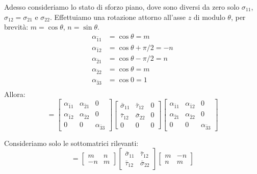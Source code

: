 Adesso consideriamo lo stato di sforzo piano, dove sono diversi da zero solo $\sigma_{11}$, $\sigma_{12}=\sigma_{21}$ e $\sigma_{22}$. Effettuiamo una rotazione attorno all'asse $z$ di modulo $\theta$, per brevità: $m=\cos{\theta}$, $n=\sin{\theta}$.
\begin{align*}
    \alpha_{\bar{1}1}&=\cos{\theta}=m\\
    \alpha_{\bar{1}2}&=\cos{\theta+\pi/2}=-n\\
    \alpha_{\bar{2}1}&=\cos{\theta-\pi/2}=n\\
    \alpha_{\bar{2}2}&=\cos{\theta}=m\\
    \alpha_{\bar{3}3}&=\cos{0}=1\\
\end{align*}
Allora:
\begin{equation*}
   [\sigma]
    =
    \begin{bmatrix}
        \alpha_{\bar{1}1} & \alpha_{\bar{2}1} & 0 \\
        \alpha_{\bar{1}2} & \alpha_{\bar{2}2} & 0\\
        0 & 0 & \alpha_{\bar{3}3}
    \end{bmatrix}
     \begin{bmatrix}
        \bar{\sigma}_{11} & \bar{\tau}_{12} & 0 \\
        \bar{\tau}_{12} & \bar{\sigma}_{22} & 0 \\
       0 & 0 & 0
    \end{bmatrix}
    \begin{bmatrix}
        \alpha_{\bar{1}1} & \alpha_{\bar{1}2} & 0 \\
        \alpha_{\bar{2}1} & \alpha_{\bar{2}2} & 0\\
        0 & 0 & \alpha_{\bar{3}3}
    \end{bmatrix}
\end{equation*}

Consideriamo solo le sottomatrici rilevanti:
\begin{equation*}
   [\sigma]
    =
    \begin{bmatrix}
        m & n \\
        -n & m
    \end{bmatrix}
     \begin{bmatrix}
        \bar{\sigma}_{11} & \bar{\tau}_{12} \\
        \bar{\tau}_{12} & \bar{\sigma}_{22}
    \end{bmatrix}
    \begin{bmatrix}
        m & -n \\
        n & m
    \end{bmatrix}
\end{equation*}

